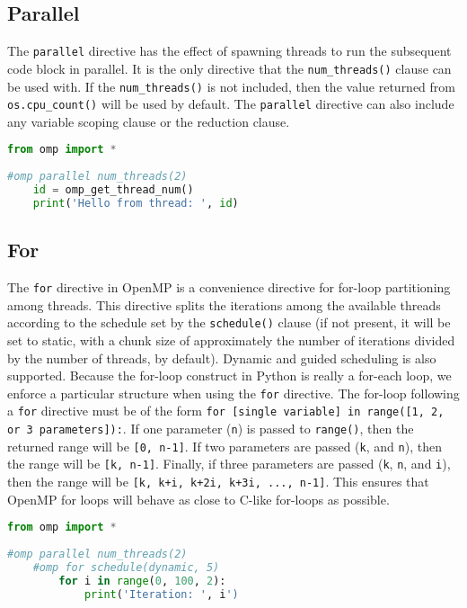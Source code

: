 \documentclass[letterpaper,12pt]{article} %
\begin{document}
\subsection{Parallel}
The \texttt{parallel} directive has the effect of spawning threads to run the subsequent code block in parallel. It is the only directive that the \texttt{num\_threads()} clause can be used with. If the \texttt{num\_threads()} is not included, then the value returned from \texttt{os.cpu\_count()} will be used by default. The \texttt{parallel} directive can also include any variable scoping clause or the reduction clause.

\begin{lstlisting}[language=Python]
 from omp import *
 
#omp parallel num_threads(2)
	id = omp_get_thread_num()
	print('Hello from thread: ', id)
\end{lstlisting}



\subsection{For}
The \texttt{for} directive in OpenMP is a convenience directive for for-loop partitioning among threads. This directive splits the iterations among the available threads according to the schedule set by the \texttt{schedule()} clause (if not present, it will be set to static, with a chunk size of approximately the number of iterations divided by the number of threads, by default). Dynamic and guided scheduling is also supported. Because the for-loop construct in Python is really a for-each loop, we enforce a particular structure when using the \texttt{for} directive. The for-loop following a \texttt{for} directive must be of the form \texttt{for [single variable] in range([1, 2, or 3 parameters]):}. If one parameter (\texttt{n}) is passed to \texttt{range()}, then the returned range will be \texttt{[0, n-1]}. If two parameters are passed (\texttt{k}, and \texttt{n}), then the range will be \texttt{[k, n-1]}. Finally, if three parameters are passed (\texttt{k}, \texttt{n}, and \texttt{i}), then the range will be \texttt{[k, k+i, k+2i, k+3i, ..., n-1]}. This ensures that OpenMP for loops will behave as close to C-like for-loops as possible.

\begin{lstlisting}[language=Python]
 from omp import *
 
#omp parallel num_threads(2)
    #omp for schedule(dynamic, 5)
        for i in range(0, 100, 2):
            print('Iteration: ', i')
\end{lstlisting}
\end{document}
